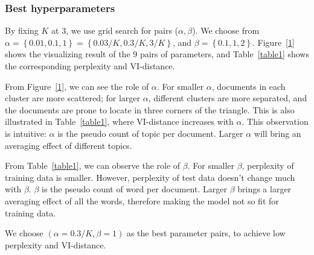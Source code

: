 \documentclass{article} %
\begin{document}
\subsubsection{Best hyperparameters}
By fixing $K$ at 3, we use grid search for pairs ($\alpha, \beta$). We choose from $\alpha = \left\{0.01, 0.1, 1\right\} = \left\{0.03/K, 0.3/K, 3/K\right\}$, and $\beta =\left\{0.1, 1, 2\right\}$. Figure~\ref{1} shows the visualizing result of the 9 pairs of parameters, and Table~\ref{table1} shows the corresponding perplexity and VI-distance.
\par
From Figure~\ref{1}, we can see the role of $\alpha$. For smaller $\alpha$, documents in each cluster are more scattered; for larger $\alpha$, different clusters are more separated, and the documents are prone to locate in three corners of the triangle. This is also illustrated in Table~\ref{table1}, where VI-distance increases with $\alpha$. This observation is intuitive: $\alpha$ is the pseudo count of topic per document. Larger $\alpha$ will bring an averaging effect of different topics.
\par
From Table~\ref{table1}, we can observe the role of $\beta$. For smaller $\beta$, perplexity of training data is smaller. However, perplexity of test data doesn't change much with $\beta$. $\beta$ is the pseudo count of word per document. Larger $\beta$ brings a larger averaging effect of all the words, therefore making the model not so fit for training data. 
\par
We choose $(\alpha =0.3/K, \beta = 1)$ as the best parameter pairs, to achieve low perplexity and VI-distance.
\par
\end{document}
